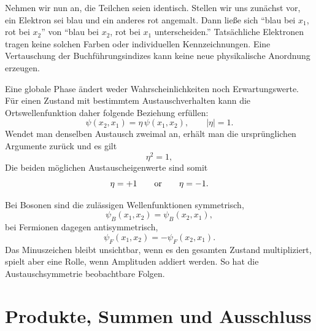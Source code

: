 Nehmen wir nun an, die Teilchen seien identisch. Stellen wir uns zunächst vor, ein Elektron sei blau und ein anderes rot angemalt. Dann ließe sich ``blau bei \(x_1\), rot bei \(x_2\)'' von ``blau bei \(x_2\), rot bei \(x_1\) unterscheiden.'' Tatsächliche Elektronen tragen keine solchen Farben oder individuellen Kennzeichnungen. Eine Vertauschung der Buchführungsindizes kann keine neue physikalische Anordnung erzeugen.

Eine globale Phase ändert weder Wahrscheinlichkeiten noch Erwartungswerte. Für einen Zustand mit bestimmtem Austauschverhalten kann die Ortswellenfunktion daher folgende Beziehung erfüllen:
\begin{equation}
\psi(x_2,x_1)=\eta\,\psi(x_1,x_2),
\qquad
\lvert\eta\rvert=1.
\end{equation}
Wendet man denselben Austausch zweimal an, erhält man die ursprünglichen Argumente zurück und es gilt
\begin{equation}
\eta^2=1,
\end{equation}
Die beiden möglichen Austauscheigenwerte sind somit
\begin{equation}
\eta=+1
\qquad\hbox{or}\qquad
\eta=-1.
\end{equation}


Bei Bosonen sind die zulässigen Wellenfunktionen symmetrisch,
\begin{equation}
\psi_B(x_1,x_2)=\psi_B(x_2,x_1),
\end{equation}
bei Fermionen dagegen antisymmetrisch,
\begin{equation}
\psi_F(x_1,x_2)=-\psi_F(x_2,x_1).
\end{equation}
Das Minuszeichen bleibt unsichtbar, wenn es den gesamten Zustand multipliziert, spielt aber eine Rolle, wenn Amplituden addiert werden. So hat die Austauschsymmetrie beobachtbare Folgen.

\section{Produkte, Summen und Ausschluss}

